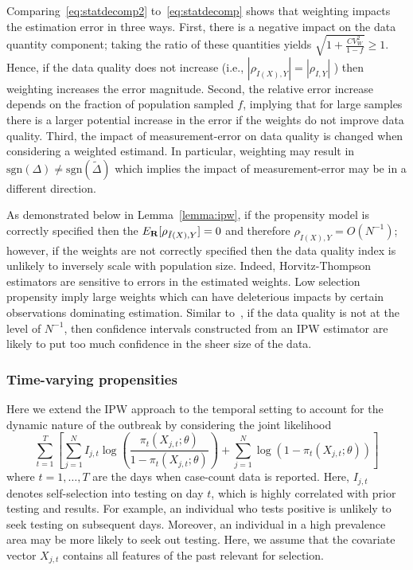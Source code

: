 \documentclass[11pt]{amsart}
\numberwithin{equation}{section}
\theoremstyle{plain}
\begin{document}
Comparing~\eqref{eq:statdecomp2} to~\eqref{eq:statdecomp} shows that weighting impacts the estimation error in three ways.  First, there is a negative impact on the data quantity component; taking the ratio of these quantities yields
$\sqrt{1 + \frac{CV_W^2}{1-f}} \geq 1$.  Hence, if the data quality does not increase (i.e., $| \rho_{\tilde I (X), Y} | = | \rho_{I,Y}|$ ) then weighting increases the error magnitude.  Second, the relative error increase depends on the fraction of population sampled $f$, implying that for large samples there is a larger potential increase in the error if the weights do not improve data quality. Third, the impact of measurement-error on data quality is changed when considering a weighted estimand. In particular, weighting may result in $\text{sgn}(\Delta) \neq \text{sgn} (\tilde \Delta)$ which implies the impact of measurement-error may be in a different direction.

As demonstrated below in Lemma~\ref{lemma:ipw}, if the propensity model is correctly specified then the $E_{\bf R} [ \rho_{\tilde I (X), Y} ] = 0$ and therefore $\rho_{\tilde I(X), Y} = O(N^{-1})$; however, if the weights are not correctly specified then the data quality index is unlikely to inversely scale with population size.  Indeed, Horvitz-Thompson estimators are sensitive to errors in the estimated weights.  Low selection propensity imply large weights which can have deleterious impacts by certain observations dominating estimation.   Similar to~\cite{Meng2018}, if the data quality is not at the level of $N^{-1}$, then confidence intervals constructed from an IPW estimator are likely to put too much confidence in the sheer size of the data.

\subsubsection{Time-varying propensities}

Here we extend the IPW approach to the temporal setting to account for the dynamic nature of the outbreak by considering the joint likelihood
\begin{equation}
\label{eq:tvpropensity}
\sum_{t=1}^T \left[ \sum_{j=1}^N I_{j,t} \log \left( \frac{\pi_t (X_{j,t}; \theta)}{1-\pi_t(X_{j,t}; \theta)} \right) + \sum_{j=1}^N \log \left( 1 - \pi_t (X_{j,t}; \theta) \right) \right]
\end{equation}
where $t=1,\ldots,T$ are the days when case-count data is reported.  Here, $I_{j,t}$ denotes self-selection into testing on day $t$, which is highly correlated with prior testing and results.  For example, an individual who tests positive is unlikely to seek testing on subsequent days.  Moreover, an individual in a high prevalence area may be more likely to seek out testing.  Here, we assume that the covariate vector $X_{j,t}$ contains all features of the past relevant for selection.
\end{document}
